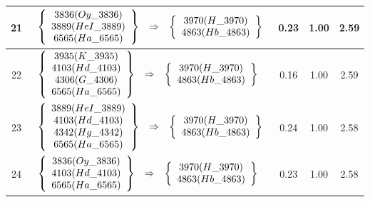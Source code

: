 \begin{longtable}{| c | l | c | c | c |}
21 & $\begin{array}{c c c}\left\{\begin{array}{c}3836 (Oy\_3836) \\ 3889 (HeI\_3889) \\ 6565 (Ha\_6565)\end{array}\right\} & \Rightarrow & \left\{\begin{array}{c}3970 (H\_3970) \\ 4863 (Hb\_4863)\end{array}\right\}\end{array}$ & 0.23 & 1.00 & 2.59 \\ \hline
22 & $\begin{array}{c c c}\left\{\begin{array}{c}3935 (K\_3935) \\ 4103 (Hd\_4103) \\ 4306 (G\_4306) \\ 6565 (Ha\_6565)\end{array}\right\} & \Rightarrow & \left\{\begin{array}{c}3970 (H\_3970) \\ 4863 (Hb\_4863)\end{array}\right\}\end{array}$ & 0.16 & 1.00 & 2.59 \\ \hline
23 & $\begin{array}{c c c}\left\{\begin{array}{c}3889 (HeI\_3889) \\ 4103 (Hd\_4103) \\ 4342 (Hg\_4342) \\ 6565 (Ha\_6565)\end{array}\right\} & \Rightarrow & \left\{\begin{array}{c}3970 (H\_3970) \\ 4863 (Hb\_4863)\end{array}\right\}\end{array}$ & 0.24 & 1.00 & 2.58 \\ \hline
24 & $\begin{array}{c c c}\left\{\begin{array}{c}3836 (Oy\_3836) \\ 4103 (Hd\_4103) \\ 6565 (Ha\_6565)\end{array}\right\} & \Rightarrow & \left\{\begin{array}{c}3970 (H\_3970) \\ 4863 (Hb\_4863)\end{array}\right\}\end{array}$ & 0.23 & 1.00 & 2.58 \\ \hline

\end{longtable}
